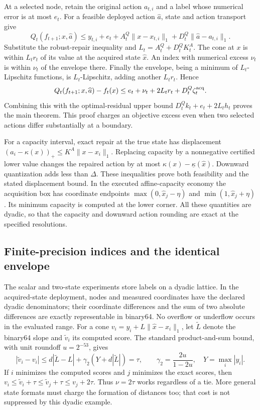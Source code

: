 At a selected node, retain the original action $a_{t,i}$ and a label whose numerical error is at most $e_t$. For a feasible deployed action $\widehat a$, state and action transport give
\[
 Q_t(f_{t+1};x,\widehat a)
 \le y_{t,i}+e_t+A_t^Q\|x-x_{t,i}\|_1
                  +D_t^Q\|\widehat a-a_{t,i}\|_1.
\]
Substitute the robust-repair inequality and $L_t=A_t^Q+D_t^QK_t^A$. The cone at $x$ is within $L_tr_t$ of its value at the acquired state $\widehat x$. An index with numerical excess $\nu_t$ is within $\nu_t$ of the envelope there. Finally the envelope, being a minimum of $L_t$-Lipschitz functions, is $L_t$-Lipschitz, adding another $L_tr_t$. Hence
\[
 Q_t(f_{t+1};x,\widehat a)-f_t(x)
 \le e_t+\nu_t+2L_tr_t+D_t^Q\zeta_t^{\rm acq}.
\]
Combining this with the optimal-residual upper bound $D_t^Qk_t+e_t+2L_th_t$ proves the main theorem. This proof charges an objective excess even when two selected actions differ substantially at a boundary.

For a capacity interval, exact repair at the true state has displacement $(a_i-\kappa(x))_+\le K^A\|x-x_i\|_1$. Replacing capacity by a nonnegative certified lower value changes the repaired action by at most $\kappa(x)-\underline\kappa(\widehat x)$. Downward quantization adds less than $\Delta$. These inequalities prove both feasibility and the stated displacement bound. In the executed affine-capacity economy the acquisition box has coordinate endpoints $\max(0,\widehat x_j-\eta)$ and $\min(1,\widehat x_j+\eta)$. Its minimum capacity is computed at the lower corner. All these quantities are dyadic, so that the capacity and downward action rounding are exact at the specified resolutions.

\subsection{Finite-precision indices and the identical envelope}
The scalar and two-state experiments store labels on a dyadic lattice. In the acquired-state deployment, nodes and measured coordinates have the declared dyadic denominators; their coordinate differences and the sum of two absolute differences are exactly representable in binary64. No overflow or underflow occurs in the evaluated range. For a cone $v_i=y_i+L\|\widehat x-x_i\|_1$, let $\widetilde L$ denote the binary64 slope and $\widetilde v_i$ its computed score. The standard product-and-sum bound, with unit roundoff $u=2^{-53}$, gives
\[
 |\widetilde v_i-v_i|
 \le d|\widetilde L-L|+\gamma_2(Y+d|\widetilde L|)=\tau,
 \qquad \gamma_2=\frac{2u}{1-2u},\quad Y=\max_i|y_i|.
\]
If $i$ minimizes the computed scores and $j$ minimizes the exact scores, then $v_i\le\widetilde v_i+\tau\le\widetilde v_j+\tau\le v_j+2\tau$. Thus $\nu=2\tau$ works regardless of a tie. More general state formats must charge the formation of distances too; that cost is not suppressed by this dyadic example.

